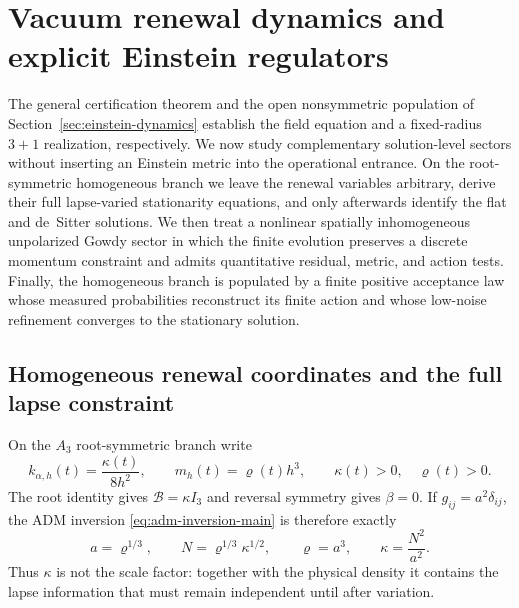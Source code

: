 \documentclass[11pt]{article}
\theoremstyle{definition}
\theoremstyle{remark}
\begin{document}
\section{Vacuum renewal dynamics and explicit Einstein regulators}
\label{sec:vacuum-main}

The general certification theorem and the open nonsymmetric population of
Section~\ref{sec:einstein-dynamics} establish the field equation and a
fixed-radius $3+1$ realization, respectively.  We now study complementary
solution-level sectors without inserting an Einstein metric into the
operational entrance.  On the root-symmetric homogeneous branch we leave the
renewal variables arbitrary, derive their full lapse-varied stationarity
equations, and only afterwards identify the flat and de~Sitter solutions.  We
then treat a nonlinear spatially inhomogeneous unpolarized Gowdy sector in
which the finite evolution preserves a discrete momentum constraint and
admits quantitative residual, metric, and action tests.  Finally, the
homogeneous branch is populated by a finite positive acceptance law whose
measured probabilities reconstruct its finite action and whose low-noise
refinement converges to the stationary solution.

\subsection{Homogeneous renewal coordinates and the full lapse constraint}
\label{subsec:homogeneous-renewal-main}

On the $A_3$ root-symmetric branch write
\begin{equation}
 k_{\alpha,h}(t)=\frac{\kappa(t)}{8h^2},
 \qquad
 m_h(t)=\varrho(t)h^3,
 \qquad \kappa(t)>0,\quad\varrho(t)>0.
 \label{eq:main-general-homogeneous-rates}
\end{equation}
The root identity gives $\mathcal B=\kappa I_3$ and reversal symmetry gives
$\beta=0$.  If $g_{ij}=a^2\delta_{ij}$, the ADM inversion
\eqref{eq:adm-inversion-main} is therefore exactly
\begin{equation}
 \boxed{
 a=\varrho^{1/3},\qquad
 N=\varrho^{1/3}\kappa^{1/2},\qquad
 \varrho=a^3,\qquad
 \kappa=\frac{N^2}{a^2}.}
 \label{eq:main-isotropic-renewal-map}
\end{equation}
Thus $\kappa$ is not the scale factor: together with the physical density it
contains the lapse information that must remain independent until after
variation.
\end{document}

